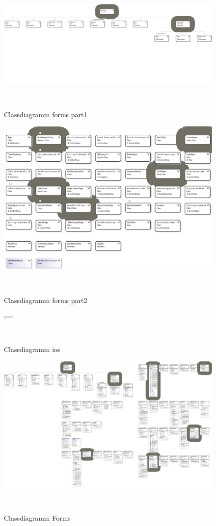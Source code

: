 \documentclass[12pt]{article}
\begin{document}
\pagestyle{empty}

  \begin{figure}[ht]
  	\centering
  	\includegraphics[width=0.9\paperwidth,keepaspectratio=true]{ClassDiagram1-part1.pdf}
  	\caption{Classdiagramm forms part1}\label{classdiagram}\
  \end{figure}

  \begin{figure}[ht]
  	\centering
  	\includegraphics[width=0.9\paperwidth,keepaspectratio=true]{ClassDiagram1-part2.pdf}
  	\caption{Classdiagramm forms part2}\label{classdiagram}\
  \end{figure}
  
  \clearpage

  \begin{figure}[ht]

  	\centering
  	\includegraphics[width=0.9\paperwidth,keepaspectratio=true]{ClassDiagramiOS.pdf}
  	\caption{Classdiagramm ios}\label{classdiagram}\
  \end{figure}

  \begin{figure}[ht]

  	\centering
  	\includegraphics[width=0.9\paperwidth,keepaspectratio=true]{ClassDiagramForms.pdf}
  	\caption{Classdiagramm Forms}\label{classdiagram}\
  \end{figure}
\end{document}
